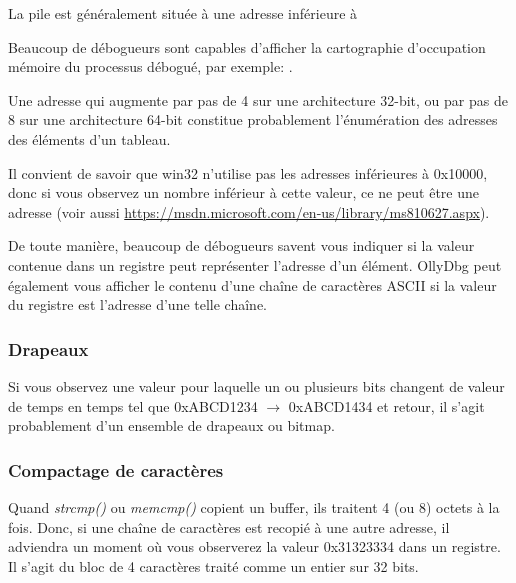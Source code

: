 La pile est généralement située à une adresse inférieure à %

Beaucoup de débogueurs sont capables d'afficher la cartographie d'occupation mémoire du processus
débogué, par exemple: .

Une adresse qui augmente par pas de 4 sur une architecture 32-bit, ou par pas de 8 sur une
architecture 64-bit constitue probablement l'énumération des adresses des éléments d'un tableau.

Il convient de savoir que win32 n'utilise pas les adresses inférieures à 0x10000, donc si vous
observez un nombre inférieur à cette valeur, ce ne peut être une adresse (voir aussi
\url{https://msdn.microsoft.com/en-us/library/ms810627.aspx}).

De toute manière, beaucoup de débogueurs savent vous indiquer si la valeur contenue dans un
registre peut représenter l'adresse d'un élément. OllyDbg peut également vous afficher le
contenu d'une chaîne de caractères ASCII si la valeur du registre est l'adresse d'une telle
chaîne.

\subsubsection{Drapeaux}

Si vous observez une valeur pour laquelle un ou plusieurs bits changent de valeur de temps en
temps tel que 0xABCD1234 $\rightarrow$ 0xABCD1434 et retour, il s'agit probablement d'un ensemble
de drapeaux ou bitmap.

\subsubsection{Compactage de caractères}

Quand \emph{strcmp()} ou \emph{memcmp()} copient un buffer, ils traitent 4 (ou 8) octets à la fois.
Donc, si une chaîne de caractères  est recopié à une autre adresse, il adviendra un
moment où vous observerez la valeur 0x31323334 dans un registre.
Il s'agit du bloc de 4 caractères traité comme un entier sur 32 bits.

